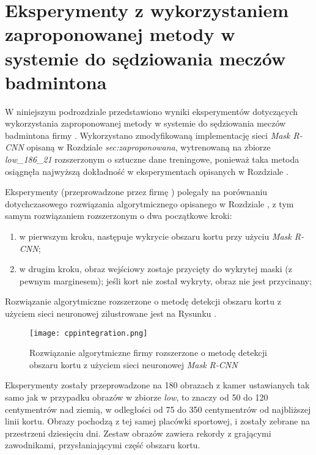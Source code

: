 \section{Eksperymenty z wykorzystaniem zaproponowanej metody w systemie do sędziowania meczów badmintona}
\label{sec:integrationblue}

W niniejszym podrozdziale przedstawiono wyniki eksperymentów dotyczących wykorzystania zaproponowanej metody w systemie do sędziowania meczów badmintona firmy \blue{}.
Wykorzystano zmodyfikowaną implementację sieci \textit{Mask R-CNN} opisaną w Rozdziale \textit{sec:zaproponowana}, wytrenowaną na zbiorze \textit{low\_186\_21} rozszerzonym o sztuczne dane treningowe, ponieważ taka metoda osiągnęła najwyższą dokładność w eksperymentach opisanych w Rozdziale .

Eksperymenty (przeprowadzone przez firmę \blue{}) polegały na porównaniu dotychczasowego rozwiązania algorytmicznego opisanego w Rozdziale , z tym samym rozwiązaniem rozszerzonym o dwa początkowe kroki:

\begin{enumerate}
  \item w pierwszym kroku, następuje wykrycie obszaru kortu przy użyciu \textit{Mask R-CNN};
  \item w drugim kroku, obraz wejściowy zostaje przycięty do wykrytej maski (z pewnym marginesem); jeśli kort nie został wykryty, obraz nie jest przycinany;
\end{enumerate}

Rozwiązanie algorytmiczne rozszerzone o metodę detekcji obszaru kortu z użyciem sieci neuronowej zilustrowane jest na Rysunku .

\begin{figure}[h]
  \centering
  \texttt{[image: cppintegration.png]}
  \caption{Rozwiązanie algorytmiczne firmy \blue{} rozszerzone o metodę detekcji obszaru kortu z użyciem sieci neuronowej \textit{Mask R-CNN}}
  \label{fig:cppintegration}
\end{figure}

Eksperymenty zostały przeprowadzone na 180 obrazach z kamer ustawianych tak samo jak w przypadku obrazów w zbiorze \textit{low}, to znaczy od 50 do 120 centymentrów nad ziemią, w odległości od 75 do 350 centymentrów od najbliższej linii kortu. Obrazy pochodzą z tej samej placówki sportowej, i zostały zebrane na przestrzeni dziesięciu dni. Zestaw obrazów zawiera rekordy z grającymi zawodnikami, przysłaniającymi część obszaru kortu.

